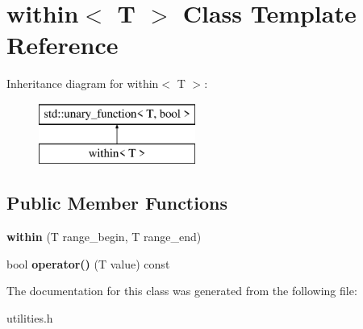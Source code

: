 \hypertarget{classwithin}{\section{within$<$ T $>$ Class Template Reference}
\label{classwithin}
}
Inheritance diagram for within$<$ T $>$\+:\begin{figure}[H]
\begin{center}
\leavevmode
\includegraphics[height=2.000000cm]{classwithin}
\end{center}
\end{figure}
\subsection*{Public Member Functions}
\begin{DoxyCompactItemize}
\item 
\hypertarget{classwithin_ac461f80eef6cbe70a69729fd5b99f751}{{\bfseries within} (T range\+\_\+begin, T range\+\_\+end)}\label{classwithin_ac461f80eef6cbe70a69729fd5b99f751}

\item 
\hypertarget{classwithin_aaab5ecca0235613f499bc5e607d23cbd}{bool {\bfseries operator()} (T value) const }\label{classwithin_aaab5ecca0235613f499bc5e607d23cbd}

\end{DoxyCompactItemize}


The documentation for this class was generated from the following file\+:\begin{DoxyCompactItemize}
\item 
utilities.\+h\end{DoxyCompactItemize}
